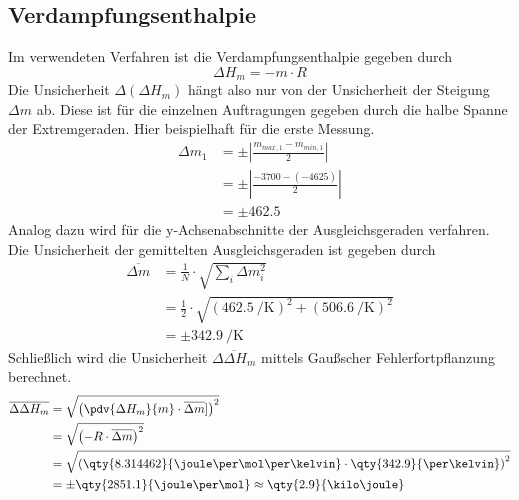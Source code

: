 \subsection{Verdampfungsenthalpie}
Im verwendeten Verfahren ist die Verdampfungsenthalpie gegeben durch
\begin{equation*}
    \Delta H_m = -m \cdot R
\end{equation*}
Die Unsicherheit $\Delta (\Delta H_m)$ hängt also nur von der Unsicherheit der Steigung $\Delta m$ ab.
Diese ist für die einzelnen Auftragungen gegeben durch die halbe Spanne der Extremgeraden.
Hier beispielhaft für die erste Messung.
\begin{align*}
    \Delta m_1 &= \pm \left| \frac{m_{max,1} - m_{min,1}}{2} \right| \\
    &= \pm \left| \frac{-3700 - (-4625)}{2} \right| \\
    &= \pm 462.5
\end{align*}
Analog dazu wird für die y-Achsenabschnitte der Ausgleichsgeraden verfahren.
Die Unsicherheit der gemittelten Ausgleichsgeraden ist gegeben durch
\begin{align*}
    \overline{\Delta m} &= \frac{1}{N} \cdot \sqrt{ \sum_i \Delta m_i^2} \\
    &= \frac{1}{2} \cdot \sqrt{(\qty{462.5}{\per\kelvin})^2 + (\qty{506.6}{\per\kelvin})^2} \\
    &= \pm \qty{342.9}{\per\kelvin}
\end{align*}
Schließlich wird die Unsicherheit $\overline{\Delta \Delta H_m}$ mittels Gaußscher Fehlerfortpflanzung berechnet.
\begin{align*}
    \overline{\Delta \Delta H_m} &= \sqrt{\left( \pdv{\Delta H_m}{m} \cdot \overline{\Delta m}] \right)^2} \\
    &= \sqrt{\left( - R \cdot \overline{\Delta m} \right)^2} \\
    &= \sqrt{\left( \qty{8.314462}{\joule\per\mol\per\kelvin} \cdot \qty{342.9}{\per\kelvin} \right)^2} \\
    &= \pm \qty{2851.1}{\joule\per\mol} \approx \qty{2.9}{\kilo\joule}
\end{align*}

